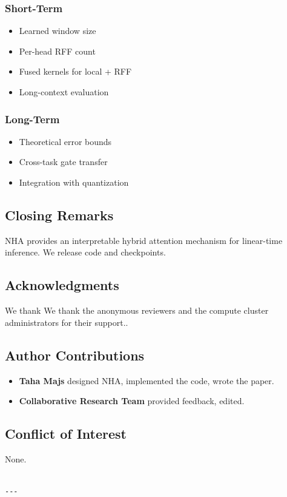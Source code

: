 \subsubsection{Short-Term}
\begin{itemize}
\item Learned window size
\item Per-head RFF count
\item Fused kernels for local + RFF
\item Long-context evaluation

\end{itemize}
\subsubsection{Long-Term}
\begin{itemize}
\item Theoretical error bounds
\item Cross-task gate transfer
\item Integration with quantization

\end{itemize}
\subsection{Closing Remarks}

NHA provides an interpretable hybrid attention mechanism for linear-time 
inference. We release code and checkpoints.

\subsection{Acknowledgments}

We thank We thank the anonymous reviewers and the compute cluster administrators for their support..

\subsection{Author Contributions}

\begin{itemize}
\item \textbf{Taha Majs} designed NHA, implemented the code, wrote the paper.
\item \textbf{Collaborative Research Team} provided feedback, edited.

\end{itemize}
\subsection{Conflict of Interest}

None.
\begin{lstlisting}

---
\end{lstlisting}